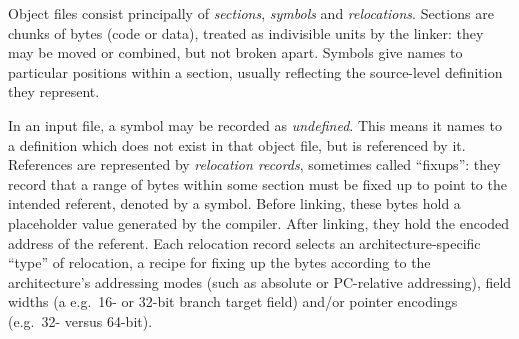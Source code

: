 Object files consist principally of \emph{sections}, \emph{symbols} and \emph{relocations}.
Sections are chunks of bytes (code or data), treated as indivisible units
by the linker: they may be moved or combined, but not broken apart. 
Symbols give names to particular positions within a section, 
usually reflecting the source-level definition they represent.

In an input file, a symbol may be recorded as \emph{undefined}.
This means it names to a definition which does not exist in that object file, but is referenced by it.
References are represented by \emph{relocation records}, sometimes called 
``fixups'': they record that a range of bytes within some section must be fixed up 
to point to the intended referent, denoted by a symbol.
Before linking, these bytes hold a placeholder value generated by the compiler.
After linking, they hold the encoded address of the referent.
Each relocation record selects an architecture-specific ``type'' of relocation, 
a recipe for fixing up the bytes according to the architecture's
addressing modes (such as absolute or PC-relative addressing),
field widths (a e.g.\ 16- or 32-bit branch target field)
and/or pointer encodings (e.g.\ 32- versus 64-bit).

% 

